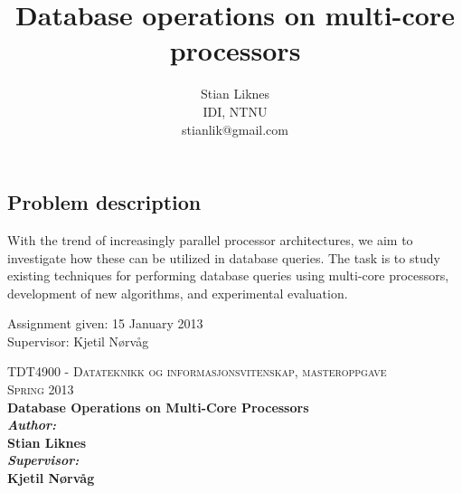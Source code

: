 \documentclass[12pt,a4paper,twoside]{report}
\begin{document}
\title{Database operations on multi-core processors}
\author{Stian Liknes\\IDI, NTNU\\stianlik@gmail.com}

\cleardoublepage
\begin{titlepage}
\section*{Problem description}

With the trend of increasingly parallel processor architectures, we
aim to investigate how these can be utilized in database queries. The
task is to study existing techniques for performing database queries
using multi-core processors, development of new algorithms, and
experimental evaluation.

Assignment given: 15 January 2013 \\
Supervisor: Kjetil Nørvåg
\end{titlepage}
\cleardoublepage
\begin{titlepage}
\begin{center}
\vspace*{\fill}

\textsc{\LARGE TDT4900 - Datateknikk og informasjonsvitenskap, masteroppgave}\\[1.5cm]
\textsc{\large Spring 2013}\\[1.5cm]

\Huge \bfseries Database Operations on Multi-Core Processors\\[1.5cm]

{\large
\emph{Author:}\\
Stian Liknes\\[0.5cm]

\emph{Supervisor:}\\
Kjetil Nørvåg\\[0.5cm]
}

\vspace{\fill}
\end{center}
\end{titlepage}
\end{document}
